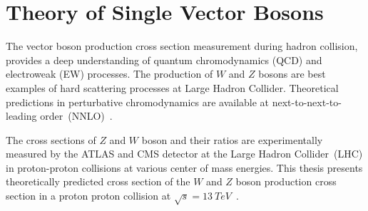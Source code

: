 

\chapter{Theory of Single Vector Bosons}
The vector boson production cross section measurement during hadron collision, provides a deep understanding of quantum chromodynamics (QCD) and electroweak (EW) processes. The production of $W$ and $Z$ bosons are best examples of hard scattering processes at Large Hadron Collider. Theoretical predictions in perturbative chromodynamics are available at next-to-next-to-leading order~(NNLO)~\cite{PhysRevD.51.44, VANNEERVEN199211}.
 
The cross sections of $Z$ and $W$ boson and their ratios are experimentally measured by the ATLAS and CMS detector at the Large Hadron Collider~(LHC) in  proton-proton collisions at various center of mass energies. This thesis presents theoretically predicted cross section of the $W$ and $Z$ boson production cross section in a proton proton collision at $\sqrt{s}=13~TeV$~\cite{2016601}.

